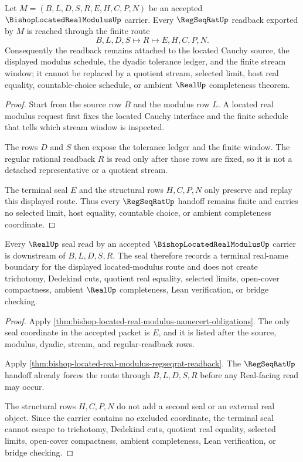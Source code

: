 \begin{theorem}
\label{thm:bishop-located-real-modulus-regseqrat-readback}
Let $M=(B,L,D,S,R,E,H,C,P,N)$ be an accepted $\BishopLocatedRealModulusUp$ carrier. Every $\RegSeqRatUp$ readback exported by $M$ is reached through the finite route
$$
B,L,D,S \longmapsto R \longmapsto E,H,C,P,N .
$$
Consequently the readback remains attached to the located Cauchy source, the displayed modulus schedule, the dyadic tolerance ledger, and the finite stream window; it cannot be replaced by a quotient stream, selected limit, host real equality, countable-choice schedule, or ambient $\RealUp$ completeness theorem.
\end{theorem}
\begin{proof}
Start from the source row $B$ and the modulus row $L$. A located real modulus request first fixes the located Cauchy interface and the finite schedule that tells which stream window is inspected.

The rows $D$ and $S$ then expose the tolerance ledger and the finite window. The regular rational readback $R$ is read only after those rows are fixed, so it is not a detached representative or a quotient stream.

The terminal seal $E$ and the structural rows $H,C,P,N$ only preserve and replay this displayed route. Thus every $\RegSeqRatUp$ handoff remains finite and carries no selected limit, host equality, countable choice, or ambient completeness coordinate.
\end{proof}

\begin{theorem}
\label{thm:bishop-located-real-modulus-real-seal-nonescape}
Every $\RealUp$ seal read by an accepted $\BishopLocatedRealModulusUp$ carrier is downstream of $B,L,D,S,R$. The seal therefore records a terminal real-name boundary for the displayed located-modulus route and does not create trichotomy, Dedekind cuts, quotient real equality, selected limits, open-cover compactness, ambient $\RealUp$ completeness, Lean verification, or bridge checking.
\end{theorem}
\begin{proof}
Apply \autoref{thm:bishop-located-real-modulus-namecert-obligations}. The only seal coordinate in the accepted packet is $E$, and it is listed after the source, modulus, dyadic, stream, and regular-readback rows.

Apply \autoref{thm:bishop-located-real-modulus-regseqrat-readback}. The $\RegSeqRatUp$ handoff already forces the route through $B,L,D,S,R$ before any Real-facing read may occur.

The structural rows $H,C,P,N$ do not add a second seal or an external real object. Since the carrier contains no excluded coordinate, the terminal seal cannot escape to trichotomy, Dedekind cuts, quotient real equality, selected limits, open-cover compactness, ambient completeness, Lean verification, or bridge checking.
\end{proof}

